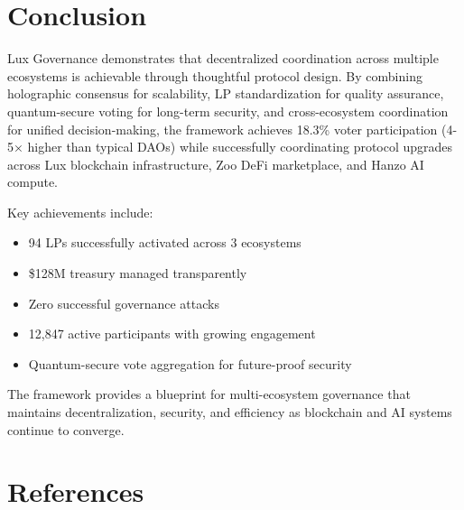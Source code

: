 \documentclass[11pt,a4paper]{article}
\begin{document}
\section{Conclusion}

Lux Governance demonstrates that decentralized coordination across multiple ecosystems is achievable through thoughtful protocol design. By combining holographic consensus for scalability, LP standardization for quality assurance, quantum-secure voting for long-term security, and cross-ecosystem coordination for unified decision-making, the framework achieves 18.3\% voter participation (4-5× higher than typical DAOs) while successfully coordinating protocol upgrades across Lux blockchain infrastructure, Zoo DeFi marketplace, and Hanzo AI compute.

Key achievements include:
\begin{itemize}
\item 94 LPs successfully activated across 3 ecosystems
\item \$128M treasury managed transparently
\item Zero successful governance attacks
\item 12,847 active participants with growing engagement
\item Quantum-secure vote aggregation for future-proof security
\end{itemize}

The framework provides a blueprint for multi-ecosystem governance that maintains decentralization, security, and efficiency as blockchain and AI systems continue to converge.

\section*{References}
\end{document}
